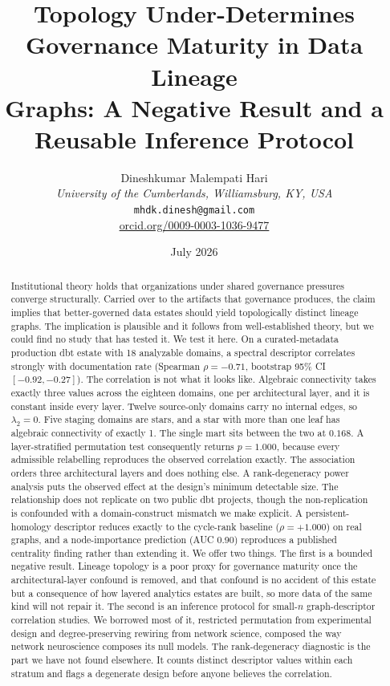 \documentclass[11pt,a4paper]{article}
\title{Topology Under-Determines Governance Maturity in Data Lineage\\
Graphs: A Negative Result and a Reusable Inference Protocol}
\author{
  Dineshkumar Malempati Hari \\
  \textit{University of the Cumberlands, Williamsburg, KY, USA} \\
  \texttt{mhdk.dinesh@gmail.com} \\
  \href{https://orcid.org/0009-0003-1036-9477}{orcid.org/0009-0003-1036-9477}
}
\date{July 2026}
\begin{document}
\maketitle

\begin{abstract}
Institutional theory holds that organizations under shared governance
pressures converge structurally. Carried over to the artifacts that
governance produces, the claim implies that better-governed data estates
should yield topologically distinct lineage graphs. The implication is
plausible and it follows from well-established theory, but we could find
no study that has tested it. We test it here. On a curated-metadata
production dbt estate with 18 analyzable domains, a spectral descriptor
correlates strongly with documentation rate (Spearman $\rho = -0.71$,
bootstrap 95\% CI $[-0.92, -0.27]$). The correlation is not what it
looks like. Algebraic connectivity takes exactly three values across the
eighteen domains, one per architectural layer, and it is constant inside
every layer. Twelve source-only domains carry no internal edges, so
$\lambda_2 = 0$. Five staging domains are stars, and a star with more
than one leaf has algebraic connectivity of exactly 1. The single mart
sits between the two at $0.168$. A layer-stratified
permutation test consequently returns $p = 1.000$, because every
admissible relabelling reproduces the observed correlation exactly. The
association orders three architectural layers and does nothing else. A
rank-degeneracy power analysis puts the observed
effect at the design's minimum detectable size. The relationship does
not replicate on two public dbt projects, though the non-replication is
confounded with a domain-construct mismatch we make explicit. A
persistent-homology descriptor reduces exactly to the cycle-rank
baseline ($\rho = +1.000$) on real graphs, and a node-importance
prediction (AUC 0.90) reproduces a published centrality finding rather
than extending it. We offer two things. The first is a bounded negative
result. Lineage topology is a poor proxy for governance maturity once
the architectural-layer confound is removed, and that confound is no
accident of this estate but a consequence of how layered analytics
estates are built, so more data of the same kind will not repair it. The
second is an inference protocol for small-$n$ graph-descriptor
correlation studies. We borrowed most of it, restricted permutation from
experimental design and degree-preserving rewiring from network science,
composed the way network neuroscience composes its null models. The
rank-degeneracy diagnostic is the part we have not found elsewhere. It
counts distinct descriptor values within each stratum and flags a
degenerate design before anyone believes the correlation.
\end{abstract}
\end{document}
